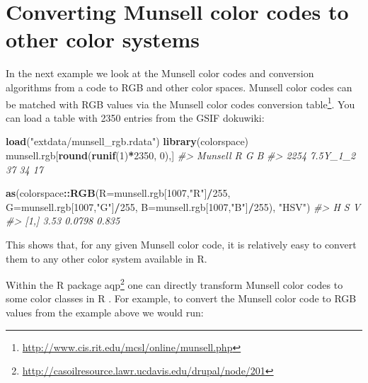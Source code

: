 \documentclass[11pt]{krantz}
\newenvironment{Shaded}{\begin{snugshade}}{\end{snugshade}}
\newcommand{\CommentTok}[1]{\textcolor[rgb]{0.37,0.37,0.37}{\textit{#1}}}
\newcommand{\DataTypeTok}[1]{\textcolor[rgb]{0.27,0.27,0.27}{#1}}
\newcommand{\DecValTok}[1]{\textcolor[rgb]{0.06,0.06,0.06}{#1}}
\newcommand{\KeywordTok}[1]{\textcolor[rgb]{0.27,0.27,0.27}{\textbf{#1}}}
\newcommand{\NormalTok}[1]{#1}
\newcommand{\OperatorTok}[1]{\textcolor[rgb]{0.43,0.43,0.43}{\textbf{#1}}}
\newcommand{\StringTok}[1]{\textcolor[rgb]{0.5,0.5,0.5}{#1}}
\renewcommand{\href}[2]{#2\footnote{\url{#1}}}
\theoremstyle{definition}
\theoremstyle{definition}
\theoremstyle{definition}
\theoremstyle{remark}
\begin{document}
\hypertarget{converting-munsell-color-codes-to-other-color-systems}{%
\section{Converting Munsell color codes to other color
systems}\label{converting-munsell-color-codes-to-other-color-systems}}

In the next example we look at the Munsell color codes and conversion
algorithms from a code to RGB and other color spaces. Munsell color
codes can be matched with RGB values via the
\href{http://www.cis.rit.edu/mcsl/online/munsell.php}{Munsell color
codes conversion table}. You can load a table with 2350 entries from the
GSIF dokuwiki:

\begin{Shaded}
\begin{Highlighting}[]
\KeywordTok{load}\NormalTok{(}\StringTok{"extdata/munsell_rgb.rdata"}\NormalTok{)}
\KeywordTok{library}\NormalTok{(colorspace)}
\NormalTok{munsell.rgb[}\KeywordTok{round}\NormalTok{(}\KeywordTok{runif}\NormalTok{(}\DecValTok{1}\NormalTok{)}\OperatorTok{*}\DecValTok{2350}\NormalTok{, }\DecValTok{0}\NormalTok{),]}
\CommentTok{#>       Munsell  R  G  B}
\CommentTok{#> 2254 7.5Y_1_2 37 34 17}
\end{Highlighting}
\end{Shaded}

\begin{Shaded}
\begin{Highlighting}[]
\KeywordTok{as}\NormalTok{(colorspace}\OperatorTok{::}\KeywordTok{RGB}\NormalTok{(}\DataTypeTok{R=}\NormalTok{munsell.rgb[}\DecValTok{1007}\NormalTok{,}\StringTok{"R"}\NormalTok{]}\OperatorTok{/}\DecValTok{255}\NormalTok{, }
                   \DataTypeTok{G=}\NormalTok{munsell.rgb[}\DecValTok{1007}\NormalTok{,}\StringTok{"G"}\NormalTok{]}\OperatorTok{/}\DecValTok{255}\NormalTok{, }
                   \DataTypeTok{B=}\NormalTok{munsell.rgb[}\DecValTok{1007}\NormalTok{,}\StringTok{"B"}\NormalTok{]}\OperatorTok{/}\DecValTok{255}\NormalTok{), }\StringTok{"HSV"}\NormalTok{)}
\CommentTok{#>         H      S     V}
\CommentTok{#> [1,] 3.53 0.0798 0.835}
\end{Highlighting}
\end{Shaded}

This shows that, for any given Munsell color code, it is relatively easy
to convert them to any other color system available in R.

Within the R
\href{http://casoilresource.lawr.ucdavis.edu/drupal/node/201}{package
aqp} one can directly transform Munsell color codes to some color
classes in R \citep{Beaudette2013CompGeo}. For example, to convert the
Munsell color code to RGB values from the example above we would run:
\end{document}

